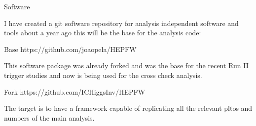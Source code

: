 \documentclass[8pt]{beamer}
\begin{document}
\begin{frame}{Software}

I have created a git software repository for analysis independent software and tools about a year ago this will be the base for the analysis code:
\begin{block}{Base}
https://github.com/joaopela/HEPFW
\end{block}

This software package was already forked and was the base for the recent Run II trigger studies and now is being used for the cross check analysis.
\begin{block}{Fork}
https://github.com/ICHiggsInv/HEPFW
\end{block}

The target is to have a framework capable of replicating all the relevant pltos and numbers of the main analysis.

\end{frame}
\end{document}
